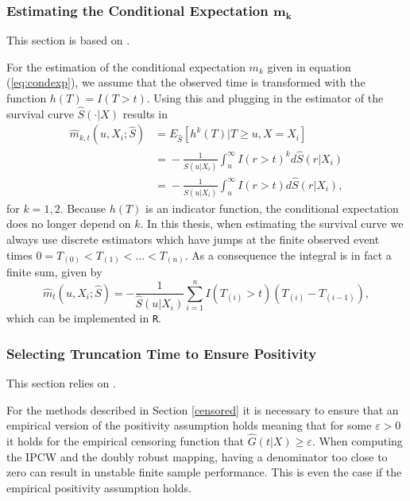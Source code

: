 \documentclass[12pt, a4paper]{scrartcl}
\theoremstyle{definition}
\theoremstyle{plain}
\numberwithin{equation}{section}
\numberwithin{figure}{section}
\numberwithin{table}{section}
\begin{document}
	\subsubsection[Estimating the Conditional Expectation $m_k$]{Estimating the Conditional Expectation $\mathbf{m_k}$}\label{sim:condexp}
	
	This section is based on \citet*{drtrees}.
	
	For the estimation of the conditional expectation $m_k$ given in equation (\ref{eq:condexp}), we assume that the observed time is transformed with the function $h(T) = I(T>t)$.
	Using this and plugging in the estimator of the survival curve $\hat{S}(\cdot\vert X)$ results in
	\begin{equation*}
	\begin{split}
	\hat{m}_{k,t} (u, X_i; \hat{S}) &={} E_{\hat{S}}[h^k(T)\vert T \geq u, X=X_i]\\
	&={}-\frac{1}{\hat{S}(u\vert X_i)}\int_u^{\infty}I(r> t)^kd\hat{S}(r\vert X_i)\\
	&={}-\frac{1}{\hat{S}(u\vert X_i)}\int_u^{\infty}I(r> t)d\hat{S}(r\vert X_i),
	\end{split}
	\end{equation*}
	for $k=1,2$.
	Because $h(T)$ is an indicator function, the conditional expectation does no longer depend on $k$.
	In this thesis, when estimating the survival curve we always use discrete estimators which have jumps at the finite observed event times $0=T_{(0)}<T_{(1)}<\dots<T_{(n)}$.
	As a consequence the integral is in fact a finite sum, given by
	\begin{equation*}
	\hat{m}_t (u, X_i; \hat{S}) = -\frac{1}{\hat{S}(u\vert X_i)}\sum_{i=1}^n I(T_{(i)}>t)(T_{(i)}-T_{(i-1)}),
	\end{equation*}
	which can be implemented in \texttt{R}.
	
	\subsubsection{Selecting Truncation Time to Ensure Positivity}\label{sim:trunc}
	
	This section relies on \citet*{drtrees}.
	
	For the methods described in Section \ref{censored} it is necessary to ensure that an empirical version of the positivity assumption holds meaning that for some $\varepsilon>0$ it holds for the empirical censoring function that $\hat{G}(t\vert X) \geq \varepsilon$.
	When computing the IPCW and the doubly robust mapping, having a denominator too close to zero can result in unstable finite sample performance.
	This is even the case if the empirical positivity assumption holds.
	
\end{document}
